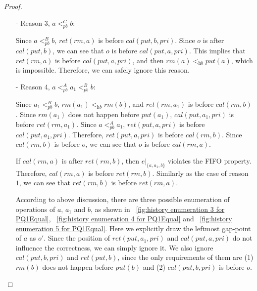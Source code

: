 \begin {proof}
\begin{itemize}
\item[-] Reason $3$, $a <_{\textit{pb}}^C b$:

    Since $a <_{\textit{pb}}^B b$, $\textit{ret}(\textit{rm},a)$ is before $\textit{cal}(\textit{put},b,\textit{pri})$. Since $o$ is after $\textit{cal}(\textit{put},b)$, we can see that $o$ is before $\textit{cal}(\textit{put},a,\textit{pri})$. This implies that $\textit{ret}(\textit{rm},a)$ is before $\textit{cal}(\textit{put},a,\textit{pri})$, and then $\textit{rm}(a) <_{\textit{hb}} \textit{put}(a)$, which is impossible. Therefore, we can safely ignore this reason.

\item[-] Reason $4$, $a <_{\textit{pb}}^A a_1 <_{\textit{pb}}^B b$:

    Since $a_1 <_{\textit{pb}}^B b$, $\textit{rm}(a_1) <_{\textit{hb}} \textit{rm}(b)$, and $\textit{ret}(\textit{rm},a_1)$ is before $\textit{cal}(\textit{rm},b)$. Since $\textit{rm}(a_1)$ does not happen before $\textit{put}(a_1)$, $\textit{cal}(\textit{put},a_1,\textit{pri})$ is before $\textit{ret}(\textit{rm},a_1)$. Since $a <_{\textit{pb}}^A a_1$, $\textit{ret}(\textit{put},a,\textit{pri})$ is before $\textit{cal}(\textit{put},a_1,\textit{pri})$. Therefore, $\textit{ret}(\textit{put},a,\textit{pri})$ is before $\textit{cal}(\textit{rm},b)$. Since $\textit{cal}(\textit{rm},b)$ is before $o$, we can see that $o$ is before $\textit{cal}(\textit{rm},a)$.

    If $\textit{cal}(\textit{rm},a)$ is after $\textit{ret}(\textit{rm},b)$, then $e \vert_{ \{ a,a_1,b \} }$ violates the FIFO property. Therefore, $\textit{cal}(\textit{rm},a)$ is before $\textit{ret}(\textit{rm},b)$. Similarly as the case of reason $1$, we can see that $\textit{ret}(\textit{rm},b)$ is before $\textit{ret}(\textit{rm},a)$.

    According to above discussion, there are three possible enumeration of operations of $a$, $a_1$ and $b$, as shown in \figurename~\ref{fig:history enumeration 3 for PQ1Equal}, \figurename~\ref{fig:history enumeration 4 for PQ1Equal} and \figurename~\ref{fig:history enumeration 5 for PQ1Equal}. Here we explicitly draw the leftmost gap-point of $a$ as $o'$. Since the position of $\textit{ret}(\textit{put},a_1,\textit{pri})$ and $\textit{cal}(\textit{put},a,\textit{pri})$ do not influence the correctness, we can simply ignore it. We also ignore $\textit{cal}(\textit{put},b,\textit{pri})$ and $\textit{ret}(\textit{put},b)$, since the only requirements of them are (1) $\textit{rm}(b)$ does not happen before $\textit{put}(b)$ and (2) $\textit{cal}(\textit{put},b,\textit{pri})$ is before $o$.


\end{itemize}
\end{proof}
